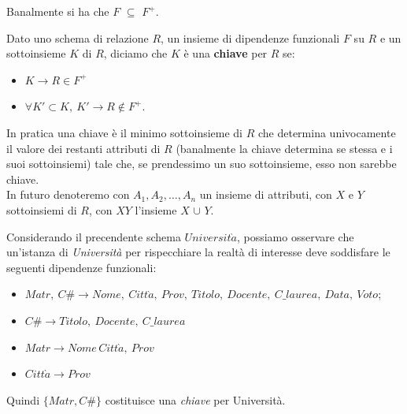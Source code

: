 Banalmente si ha che $F$ $\subseteq$ $F^+$.\\
\begin{defn}
 Dato uno schema di relazione $R$, un insieme di dipendenze funzionali $F$ su $R$ e un
sottoinsieme $K$ di $R$, diciamo che $K$ è una \textbf{chiave} per $R$ se:
\begin{itemize}
 \item $K \rightarrow R \in F^+$
 \item $\forall K'\subset K,\ K'\rightarrow R \notin F^+$.
\end{itemize}
\end{defn}
In pratica una chiave è il minimo sottoinsieme di $R$ che determina univocamente il 
valore dei restanti attributi di $R$ (banalmente la chiave determina se stessa e i 
suoi sottoinsiemi) tale che, se prendessimo un suo sottoinsieme, esso non sarebbe 
chiave.\\
In futuro denoteremo con $A_1, A_2, \ldots, A_n$ un insieme di attributi, con $X$ 
e $Y$ sottoinsiemi di $R$, con $XY$ l'insieme $X$ $\cup$ $Y$.

\begin{exmp}
 Considerando il precendente schema $Universit\grave{a}$, possiamo osservare che un'istanza 
 di \emph{Università} per rispecchiare la realtà di interesse deve soddisfare le seguenti 
 dipendenze funzionali:
 \begin{itemize}
  \item $Matr,\ C\# \rightarrow Nome,\ Citt\grave{a},\ Prov,\ Titolo,\ Docente,\ C\_laurea,
  \ Data,\ Voto$;
  \item $C\# \rightarrow Titolo,\ Docente,\ C\_laurea$
  \item $Matr \rightarrow Nome\, Citt\grave{a},\ Prov$
  \item $Citt\grave{a} \rightarrow Prov$
 \end{itemize}
 Quindi $\{Matr, C\#\}$ costituisce una \emph{chiave} per Università.
\end{exmp}

